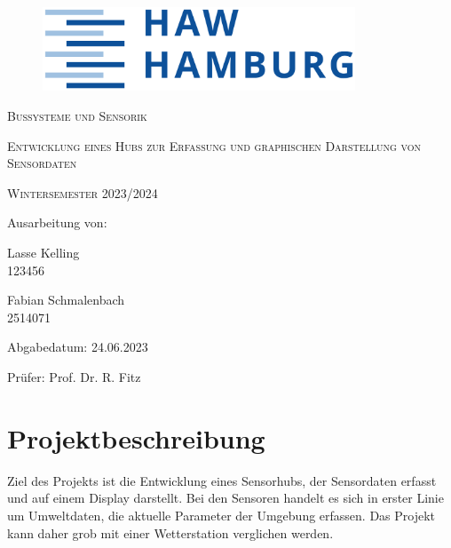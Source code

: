 \documentclass[a4paper,11pt]{article}
\begin{document}
\begin{titlepage}

\begin{figure}
 \centering
 \includegraphics[height=2.5cm]{HAWLogo}
\end{figure}

\vspace*{2cm}
\centering
{\scshape\Large Bussysteme und Sensorik \par}
\vspace{1cm}
{\scshape\LARGE Entwicklung eines Hubs zur Erfassung und graphischen Darstellung von Sensordaten \par}
\vspace{0.5cm}
{\scshape\large Wintersemester 2023/2024 \par}
\vspace{5cm}

\raggedright
Ausarbeitung von:

\vspace{0.5cm}
Lasse Kelling \\
123456 %

\vspace{0.2cm}
Fabian Schmalenbach \\
2514071

\vspace{0.5cm}
Abgabedatum: 24.06.2023

\vspace{0.5cm}
Prüfer: Prof. Dr. R. Fitz



\end{titlepage}

\newpage
{}
\tableofcontents
\thispagestyle{empty}
\newpage

\setcounter{page}{1}    %

\section{Projektbeschreibung}
\label{sub:projektbeschreibung}

Ziel des Projekts ist die Entwicklung eines Sensorhubs, der Sensordaten erfasst und auf einem Display darstellt. 
Bei den Sensoren handelt es sich in erster Linie um Umweltdaten, die aktuelle Parameter der Umgebung erfassen. 
Das Projekt kann daher grob mit einer Wetterstation verglichen werden. 
\end{document}
